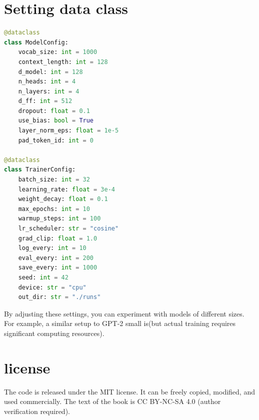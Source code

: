 \section{Setting data class}

\begin{lstlisting}[language=Python]
@dataclass
class ModelConfig:
    vocab_size: int = 1000
    context_length: int = 128
    d_model: int = 128
    n_heads: int = 4
    n_layers: int = 4
    d_ff: int = 512
    dropout: float = 0.1
    use_bias: bool = True
    layer_norm_eps: float = 1e-5
    pad_token_id: int = 0

@dataclass
class TrainerConfig:
    batch_size: int = 32
    learning_rate: float = 3e-4
    weight_decay: float = 0.1
    max_epochs: int = 10
    warmup_steps: int = 100
    lr_scheduler: str = "cosine"
    grad_clip: float = 1.0
    log_every: int = 10
    eval_every: int = 200
    save_every: int = 1000
    seed: int = 42
    device: str = "cpu"
    out_dir: str = "./runs"
\end{lstlisting}

By adjusting these settings, you can experiment with models of different sizes. For example, a similar setup to GPT-2 small is(but actual training requires significant computing resources).

\section{license}

The code is released under the MIT license. It can be freely copied, modified, and used commercially. The text of the book is CC BY-NC-SA 4.0 (author verification required).

